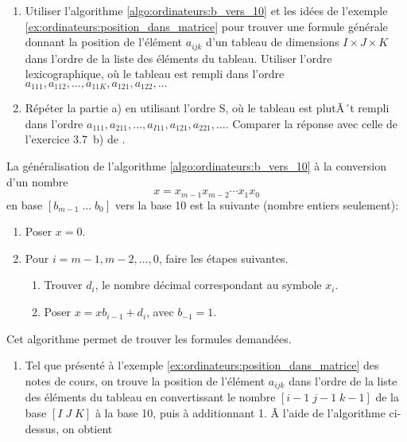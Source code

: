 \begin{exercice}
  \begin{enumerate}
  \item Utiliser l'algorithme \ref{algo:ordinateurs:b_vers_10} et les
    idées de l'exemple \ref{ex:ordinateurs:position_dans_matrice} pour
    trouver une formule générale donnant la position de l'élément
    $a_{ijk}$ d'un tableau de dimensions $I \times J \times K$ dans
    l'ordre de la liste des éléments du tableau. Utiliser l'ordre
    lexicographique, où le tableau est rempli dans l'ordre $a_{111},
    a_{112}, \dots, a_{11K}, a_{121}, a_{122}, \dots$
  \item Répéter la partie a) en utilisant l'ordre S, où le tableau
    est plutÃ´t rempli dans l'ordre $a_{111}, a_{211}, \dots, a_{I11},
    a_{121}, a_{221}, \dots$.  Comparer la réponse avec celle de
    l'exercice 3.7~b) de \cite{Goulet_intro_S}.
  \end{enumerate}
  \begin{sol}
    La généralisation de l'algorithme \ref{algo:ordinateurs:b_vers_10}
    à la conversion d'un nombre
    \begin{displaymath}
      x = x_{m-1}x_{m-2} \cdots x_1x_0
    \end{displaymath}
    en base $[b_{m-1}\; \dots\; b_0]$ vers la base 10 est la suivante
    (nombre entiers seulement):
    \begin{enumerate}
      \pointedenum
    \item Poser $x = 0$.
    \item Pour $i = m - 1, m - 2, \dots, 0$, faire les étapes suivantes.
      \begin{enumerate}
      \item Trouver $d_i$, le nombre décimal correspondant au symbole
        $x_i$.
      \item Poser $x = x b_{i - 1} + d_i$, avec $b_{-1} = 1$.
      \end{enumerate}
    \end{enumerate}
    Cet algorithme permet de trouver les formules demandées.
    \begin{enumerate}
    \item Tel que présenté à l'exemple
      \ref{ex:ordinateurs:position_dans_matrice} des notes de cours,
      on trouve la position de l'élément $a_{ijk}$ dans l'ordre de la
      liste des éléments du tableau en convertissant le nombre $[i -
      1\; j - 1\; k - 1]$ de la base $[I\; J\; K]$ à la base 10, puis
      à additionnant 1. Ã l'aide de l'algorithme ci-dessus, on obtient

\end{enumerate}
\end{sol}
\end{exercice}
